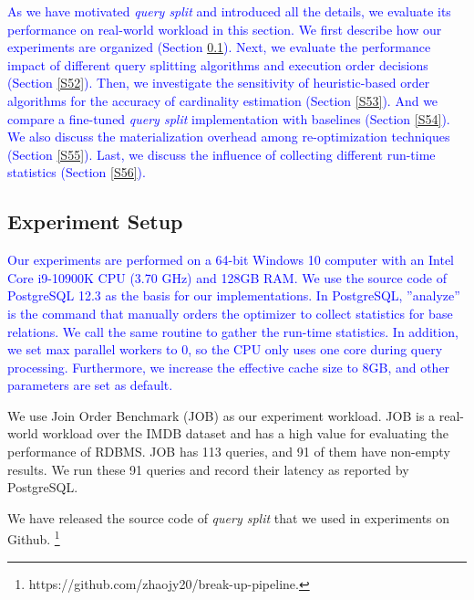 \textcolor{blue}{
    As we have motivated \textit{query split} and introduced all the details, we evaluate its performance on real-world workload in this section. We first describe how our experiments are organized (Section \ref{S51}). Next, we evaluate the performance impact of different query splitting algorithms and execution order decisions (Section \ref{S52}). Then, we investigate the sensitivity of heuristic-based order algorithms for the accuracy of cardinality estimation (Section \ref{S53}). And we compare a fine-tuned \textit{query split} implementation with baselines (Section \ref{S54}). We also discuss the materialization overhead among re-optimization techniques (Section \ref{S55}). Last, we discuss the influence of collecting different run-time statistics (Section \ref{S56}).
}
\subsection{Experiment Setup} \label{S51}
\textcolor{blue}{
    Our experiments are performed on a 64-bit Windows 10 computer with an Intel Core i9-10900K CPU (3.70 GHz) and 128GB RAM. We use the source code of PostgreSQL 12.3 as the basis for our implementations. In PostgreSQL, ”analyze” is the command that manually orders the optimizer to collect statistics for base relations. We call the same routine to gather the run-time statistics. In addition, we set max parallel workers to 0, so the CPU only uses one core during query processing. Furthermore, we increase the effective cache size to 8GB, and other parameters are set as default.
}\par
    We use Join Order Benchmark (JOB) \cite{JOB} as our experiment workload. JOB is a real-world workload over the IMDB dataset and has a high value for evaluating the performance of RDBMS. JOB has 113 queries, and 91 of them have non-empty results. We run these 91 queries and record their latency as reported by PostgreSQL.\par
    We have released the source code of \textit{query split} that we used in experiments on Github. \footnote[2]{https://github.com/zhaojy20/break-up-pipeline.}

